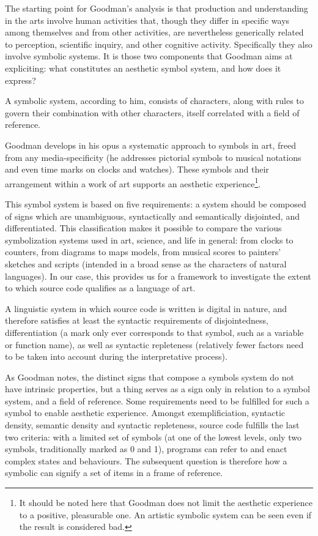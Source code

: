 The starting point for Goodman's analysis is that production and understanding in the arts involve human activities that, though they differ in specific ways among themselves and from other activities, are nevertheless generically related to perception, scientific inquiry, and other cognitive activity. Specifically they also involve symbolic systems.  It is those two components that Goodman aims at expliciting: what constitutes an aesthetic symbol system, and how does it express?

A symbolic system, according to him, consists of characters, along with rules to govern their combination with other characters, itself correlated with a field of reference.

Goodman develops in his opus a systematic approach to symbols in art, freed from any media-specificity (he addresses pictorial symbols to musical notations and even time marks on clocks and watches). These symbols and their arrangement within a work of art supports an aesthetic experience\footnote{It should be noted here that Goodman does not limit the aesthetic experience to a positive, pleasurable one. An artistic symbolic system can be seen even if the result is considered bad.}.

This symbol system is based on five requirements: a system should be composed of signs which are unambiguous, syntactically and semantically disjointed, and differentiated. This classification makes it possible to compare the various symbolization systems used in art, science, and life in general: from clocks to counters, from diagrams to maps models, from musical scores to painters’ sketches and scripts (intended in a broad sense as the characters of natural languages). In our case, this provides us for a framework to investigate the extent to which source code qualifies as a language of art.

 A linguistic system in which source code is written is digital in nature, and therefore satisfies at least the syntactic requirements of disjointedness, differentiation (a mark only ever corresponds to that symbol, such as a variable or function name), as well as syntactic repleteness (relatively fewer factors need to be taken into account during the interpretative process).

As Goodman notes, the distinct signs that compose a symbols system do not have intrinsic properties, but a thing serves as a sign only in relation to a symbol system, and a field of reference. Some requirements need to be fulfilled for such a symbol to enable aesthetic experience. Amongst exemplificiation, syntactic density, semantic density and syntactic repleteness, source code fulfills the last two criteria: with a limited set of symbols (at one of the lowest levels, only two symbols, traditionally marked as 0 and 1), programs can refer to and enact complex states and behaviours. The subsequent question is therefore how a symbolic can signify a set of items in a frame of reference.

